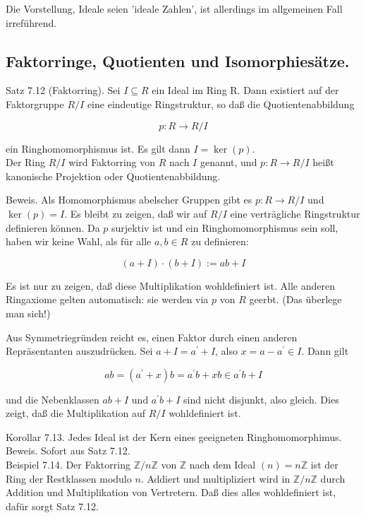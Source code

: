 \documentclass[10pt, letterpaper]{article}
\begin{document}
Die Vorstellung, Ideale seien 'ideale Zahlen', ist allerdings im allgemeinen Fall irreführend.

\subsection*{Faktorringe, Quotienten und Isomorphiesätze.}
Satz 7.12 (Faktorring). Sei $I \subseteq R$ ein Ideal im Ring R. Dann existiert auf der Faktorgruppe $R / I$ eine eindeutige Ringstruktur, so daß die Quotientenabbildung

$$
p: R \rightarrow R / I
$$

ein Ringhomomorphismus ist. Es gilt dann $I=\operatorname{ker}(p)$.\\
Der Ring $R / I$ wird Faktorring von $R$ nach $I$ genannt, und $p: R \rightarrow R / I$ heißt kanonische Projektion oder Quotientenabbildung.

Beweis. Als Homomorphismus abelscher Gruppen gibt es $p: R \rightarrow R / I$ und $\operatorname{ker}(p)=I$. Es bleibt zu zeigen, daß wir auf $R / I$ eine verträgliche Ringstruktur definieren können. Da $p$ surjektiv ist und ein Ringhomomorphismus sein soll, haben wir keine Wahl, als für alle $a, b \in R$ zu definieren:

$$
(a+I) \cdot(b+I):=a b+I
$$

Es ist nur zu zeigen, daß diese Multiplikation wohldefiniert ist. Alle anderen Ringaxiome gelten automatisch: sie werden via $p$ von $R$ geerbt. (Das überlege man sich!)

Aus Symmetriegründen reicht es, einen Faktor durch einen anderen Repräsentanten auszudrücken. Sei $a+I=a^{\prime}+I$, also $x=a-a^{\prime} \in I$. Dann gilt

$$
a b=\left(a^{\prime}+x\right) b=a^{\prime} b+x b \in a^{\prime} b+I
$$

und die Nebenklassen $a b+I$ und $a^{\prime} b+I$ sind nicht disjunkt, also gleich. Dies zeigt, daß die Multiplikation auf $R / I$ wohldefiniert ist.

Korollar 7.13. Jedes Ideal ist der Kern eines geeigneten Ringhomomorphimus.\\
Beweis. Sofort aus Satz 7.12.\\
Beispiel 7.14. Der Faktorring $\mathbb{Z} / n \mathbb{Z}$ von $\mathbb{Z}$ nach dem Ideal $(n)=n \mathbb{Z}$ ist der Ring der Restklassen modulo $n$. Addiert und multipliziert wird in $\mathbb{Z} / n \mathbb{Z}$ durch Addition und Multiplikation von Vertretern. Daß dies alles wohldefiniert ist, dafür sorgt Satz 7.12.
\end{document}
